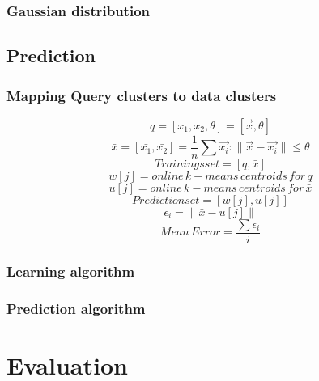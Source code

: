 \documentclass{lmproj}
\begin{document}
\subsection{Gaussian distribution}

\section{Prediction}
\subsection{Mapping Query clusters to data clusters}
\begin{equation}
q=[x_1,x_2,\theta] =[\vec{x},\theta]
\end{equation}
\begin{equation}
\bar{x}=[\bar{x_1},\bar{x_2}]=\frac{1}{n}\sum \vec{x_i}:\parallel \vec{x}-\vec{x_i}\parallel \leq \theta
\end{equation}
\begin{equation}
Trainingsset=[q,\bar{x}]
\end{equation}
\begin{equation}
w[j]= online\,k-means\,centroids\,for\,q
\end{equation}
\begin{equation}
u[j]= online\,k-means\,centroids\,for\,\bar{x}
\end{equation}
\begin{equation}
Predictionset=[w[j],u[j]]
\end{equation}
\begin{equation}
\epsilon_i = \parallel \bar{x} - u[j] \parallel 
\end{equation}
\begin{equation}
Mean\,Error= \frac{\sum\epsilon_i}{i}
\end{equation}
\subsection{Learning algorithm}
\subsection{Prediction algorithm}

\chapter{Evaluation}
\end{document}

